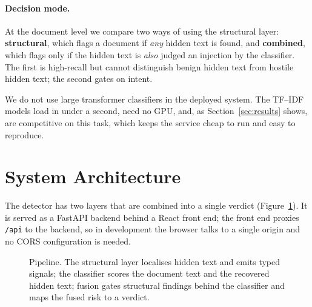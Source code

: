 \documentclass[11pt]{article}
\begin{document}
\paragraph{Decision mode.} At the document level we compare two ways of using
the structural layer: \textbf{structural}, which flags a document if
\emph{any} hidden text is found, and \textbf{combined}, which flags only if the
hidden text is \emph{also} judged an injection by the classifier. The first is
high-recall but cannot distinguish benign hidden text from hostile hidden text;
the second gates on intent.

We do not use large transformer classifiers in the deployed system. The
TF--IDF models load in under a second, need no GPU, and, as
Section~\ref{sec:results} shows, are competitive on this task, which keeps the
service cheap to run and easy to reproduce.

\section{System Architecture}
\label{sec:architecture}

The detector has two layers that are combined into a single verdict
(Figure~\ref{fig:arch}). It is served as a FastAPI backend behind a React front
end; the front end proxies \texttt{/api} to the backend, so in development the
browser talks to a single origin and no CORS configuration is needed.

\begin{figure}[t]
  \centering
  \caption{Pipeline. The structural layer localises hidden text and emits typed
  signals; the classifier scores the document text and the recovered hidden
  text; fusion gates structural findings behind the classifier and maps the
  fused risk to a verdict.}
  \label{fig:arch}
\end{figure}
\end{document}
